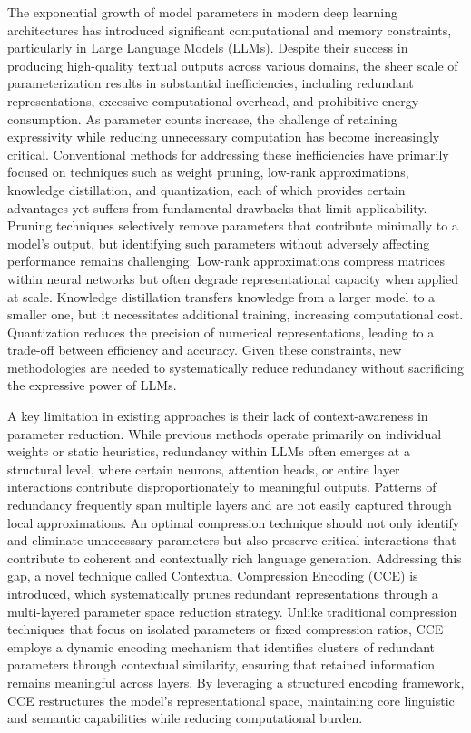 \documentclass{article}
\begin{document}
The exponential growth of model parameters in modern deep learning architectures has introduced significant computational and memory constraints, particularly in Large Language Models (LLMs). Despite their success in producing high-quality textual outputs across various domains, the sheer scale of parameterization results in substantial inefficiencies, including redundant representations, excessive computational overhead, and prohibitive energy consumption. As parameter counts increase, the challenge of retaining expressivity while reducing unnecessary computation has become increasingly critical. Conventional methods for addressing these inefficiencies have primarily focused on techniques such as weight pruning, low-rank approximations, knowledge distillation, and quantization, each of which provides certain advantages yet suffers from fundamental drawbacks that limit applicability. Pruning techniques selectively remove parameters that contribute minimally to a model’s output, but identifying such parameters without adversely affecting performance remains challenging. Low-rank approximations compress matrices within neural networks but often degrade representational capacity when applied at scale. Knowledge distillation transfers knowledge from a larger model to a smaller one, but it necessitates additional training, increasing computational cost. Quantization reduces the precision of numerical representations, leading to a trade-off between efficiency and accuracy. Given these constraints, new methodologies are needed to systematically reduce redundancy without sacrificing the expressive power of LLMs. 

A key limitation in existing approaches is their lack of context-awareness in parameter reduction. While previous methods operate primarily on individual weights or static heuristics, redundancy within LLMs often emerges at a structural level, where certain neurons, attention heads, or entire layer interactions contribute disproportionately to meaningful outputs. Patterns of redundancy frequently span multiple layers and are not easily captured through local approximations. An optimal compression technique should not only identify and eliminate unnecessary parameters but also preserve critical interactions that contribute to coherent and contextually rich language generation. Addressing this gap, a novel technique called Contextual Compression Encoding (CCE) is introduced, which systematically prunes redundant representations through a multi-layered parameter space reduction strategy. Unlike traditional compression techniques that focus on isolated parameters or fixed compression ratios, CCE employs a dynamic encoding mechanism that identifies clusters of redundant parameters through contextual similarity, ensuring that retained information remains meaningful across layers. By leveraging a structured encoding framework, CCE restructures the model’s representational space, maintaining core linguistic and semantic capabilities while reducing computational burden.
\end{document}
